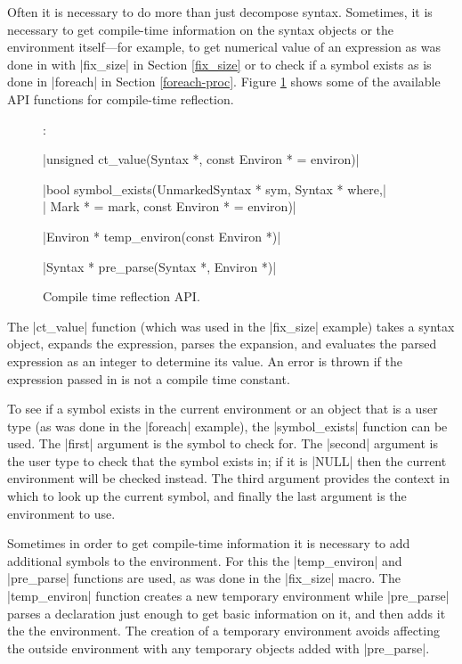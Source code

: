 Often it is necessary to do more than just decompose syntax.
Sometimes, it is necessary to get compile-time information on the
syntax objects or the environment itself---for example, to get numerical
value of an expression as was done in with |fix_size| in Section
\ref{fix_size} or to check if a symbol exists as is done in |foreach|
in Section \ref{foreach-proc}.  Figure \ref{ctf} shows some of the
available API functions for compile-time reflection.

\begin{figure}
\begin{apil}
\item {}:
\begin{apill}
\item |unsigned ct_value(Syntax *, const Environ * = environ)|
\item |bool symbol_exists(UnmarkedSyntax * sym, Syntax * where,|\\
      |                   Mark * = mark, const Environ * = environ)|
\item |Environ * temp_environ(const Environ *)|
\item |Syntax * pre_parse(Syntax *, Environ *)|
\end{apill}
\end{apil}
\caption{Compile time reflection API.}
\label{ctf}
\end{figure}

The |ct_value| function (which was used in the |fix_size| example)
takes a syntax object, expands the expression, parses the expansion,
and evaluates the parsed expression as an integer to determine its
value.  An error is thrown if the expression passed in is not a
compile time constant.

To see if a symbol exists in the current environment or an object that
is a user type (as was done in the |foreach| example), the
|symbol_exists| function can be used.  The |first| argument is the
symbol to check for.  The |second| argument is the user type to check
that the symbol exists in; if it is |NULL| then the current
environment will be checked instead.  The third argument provides the
context in which to look up the current symbol, and finally the last
argument is the environment to use.

Sometimes in order to get compile-time information it is necessary to
add additional symbols to the environment.  For this the
|temp_environ| and |pre_parse| functions are used, as was done in the
|fix_size| macro.  The |temp_environ| function creates a new temporary
environment while |pre_parse| parses a declaration just enough to get
basic information on it, and then adds it the the environment. The
creation of a temporary environment avoids affecting the outside
environment with any temporary objects added with |pre_parse|.

